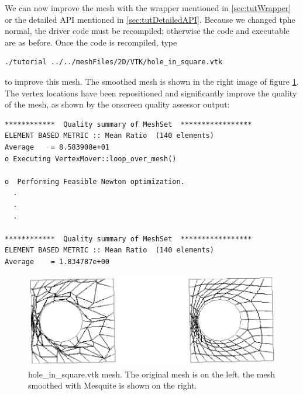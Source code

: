 We can now improve the mesh with the wrapper mentioned in
\ref{sec:tutWrapper} or the detailed API mentioned in
\ref{sec:tutDetailedAPI}. 
Because we changed tphe normal, the driver code must be recompiled;
otherwise the code and executable are as before.
Once the code is recompiled, type 
\begin{verbatim}
./tutorial ../../meshFiles/2D/VTK/hole_in_square.vtk
\end{verbatim}
to improve this mesh.
The smoothed mesh is shown in the right image of figure
\ref{fig:hole}.
The vertex locations have been repositioned and significantly improve
the quality of the mesh, as shown by the onscreen
quality assessor output: 
\begin{verbatim}
************  Quality summary of MeshSet  *****************
ELEMENT BASED METRIC :: Mean Ratio  (140 elements)
Average    = 8.583908e+01
o Executing VertexMover::loop_over_mesh()

o  Performing Feasible Newton optimization.
  .
  .
  .

************  Quality summary of MeshSet  *****************
ELEMENT BASED METRIC :: Mean Ratio  (140 elements)
Average    = 1.834787e+00
\end{verbatim}
\begin{figure}[htbp]
\begin{center}
    \includegraphics{hole_in_square.ps}
    \caption{hole\_in\_square.vtk mesh. The original mesh is on the left, the mesh smoothed with
    Mesquite is shown on the right.}
    \label{fig:hole}
\end{center}
\end{figure}
